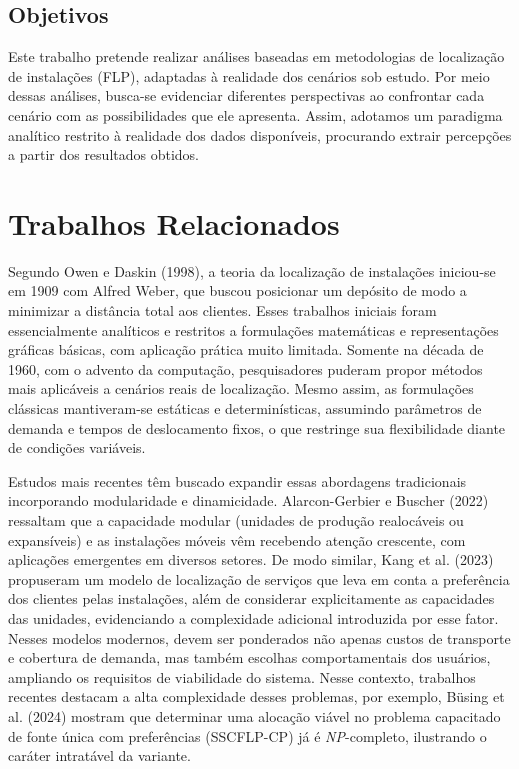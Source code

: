 \documentclass[12pt]{article}
\begin{document}
\subsection{Objetivos}

Este trabalho pretende realizar análises baseadas em metodologias de localização de instalações (FLP), adaptadas à realidade dos cenários sob estudo. Por meio dessas análises, busca-se evidenciar diferentes perspectivas ao confrontar cada cenário com as possibilidades que ele apresenta. Assim, adotamos um paradigma analítico restrito à realidade dos dados disponíveis, procurando extrair percepções a partir dos resultados obtidos.

\section{Trabalhos Relacionados}

Segundo Owen e Daskin (1998), a teoria da localização de instalações iniciou-se em 1909 com Alfred Weber, que buscou posicionar um depósito de modo a minimizar a distância total aos clientes. Esses trabalhos iniciais foram essencialmente analíticos e restritos a formulações matemáticas e representações gráficas básicas, com aplicação prática muito limitada. Somente na década de 1960, com o advento da computação, pesquisadores puderam propor métodos mais aplicáveis a cenários reais de localização. Mesmo assim, as formulações clássicas mantiveram-se estáticas e determinísticas, assumindo parâmetros de demanda e tempos de deslocamento fixos, o que restringe sua flexibilidade diante de condições variáveis.

Estudos mais recentes têm buscado expandir essas abordagens tradicionais incorporando modularidade e dinamicidade. Alarcon-Gerbier e Buscher (2022) ressaltam que a capacidade modular (unidades de produção realocáveis ou expansíveis) e as instalações móveis vêm recebendo atenção crescente, com aplicações emergentes em diversos setores. De modo similar, Kang et al. (2023) propuseram um modelo de localização de serviços que leva em conta a preferência dos clientes pelas instalações, além de considerar explicitamente as capacidades das unidades, evidenciando a complexidade adicional introduzida por esse fator. Nesses modelos modernos, devem ser ponderados não apenas custos de transporte e cobertura de demanda, mas também escolhas comportamentais dos usuários, ampliando os requisitos de viabilidade do sistema. Nesse contexto, trabalhos recentes destacam a alta complexidade desses problemas, por exemplo, Büsing et al. (2024) mostram que determinar uma alocação viável no problema capacitado de fonte única com preferências (SSCFLP-CP) já é \textit{NP}-completo, ilustrando o caráter intratável da variante.
\end{document}
